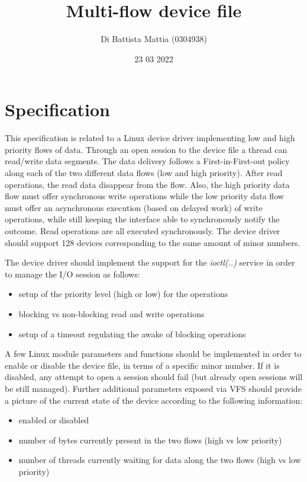 \documentclass[12pt]{report}
\title{Multi-flow device file}
\author{Di Battista Mattia (0304938)}
\date{23 03 2022}
\begin{document}
\maketitle

\tableofcontents

\chapter{Specification}

This specification is related to a Linux device driver implementing low and high priority flows of data.
Through an open session to the device file a thread can read/write data segments. The data delivery
follows a First-in-First-out policy along each of the two different data flows (low and high priority). After
read operations, the read data disappear from the flow. Also, the high priority data flow must offer
synchronous write operations while the low priority data flow must offer an asynchronous execution
(based on delayed work) of write operations, while still keeping the interface able to synchronously notify
the outcome. Read operations are all executed synchronously. The device driver should support 128
devices corresponding to the same amount of minor numbers.

The device driver should implement the support for the \emph{ioctl(..)} service in order to manage the I/O session
as follows:
\begin{itemize}
\item setup of the priority level (high or low) for the operations
\item blocking vs non-blocking read and write operations
\item setup of a timeout regulating the awake of blocking operations
\end{itemize}

A few Linux module parameters and functions should be implemented in order to enable or disable the
device file, in terms of a specific minor number. If it is disabled, any attempt to open a session should fail
(but already open sessions will be still managed). Further additional parameters exposed via VFS should
provide a picture of the current state of the device according to the following information:
\begin{itemize}
\item enabled or disabled
\item number of bytes currently present in the two flows (high vs low priority)
\item number of threads currently waiting for data along the two flows (high vs low priority)
\end{itemize}
\end{document}
